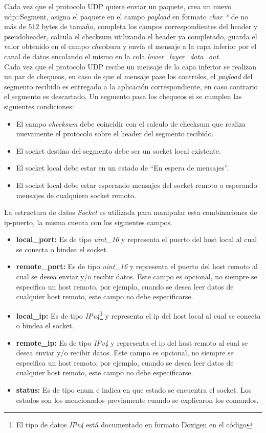\documentclass[10pt,a4paper]{article}
\begin{document}
Cada vez que el protocolo UDP quiere enviar un paquete, crea un nuevo udp::Segment, asigna el paquete en el campo \textit{payload} en formato \textit{char *} de no más de $512$ bytes de tamaño, completa los campos correspondientes del header y pseudoheader, calcula el checksum utilizando el header ya completado, guarda el valor obtenido en el campo \textit{checksum} y envía el mensaje a la capa inferior por el canal de datos encolando el mismo en la cola \textit{lower\_layer\_data\_out}. \\

Cada vez que el protocolo UDP recibe un mensaje de la capa inferior se realizan un par de chequeos, en caso de que el mensaje pase los controles, el \textit{payload} del segmento recibido es entregado a la aplicación correspondiente, en caso contrario el segmento es descartado. Un segmento pasa los chequeos si se cumplen las siguientes condiciones:

\begin{itemize}
\item El campo \textit{checksum} debe coincidir con el calculo de checksum que realiza nuevamente el protocolo sobre el header del segmento recibido.
\item El socket destino del segmento debe ser un socket local existente.
\item El socket local debe estar en un estado de ``En espera de mensajes''.
\item El socket local debe estar esperando mensajes del socket remoto o esperando mensajes de cualquiero socket remoto.
\end{itemize}

La estructura de datos \textit{Socket} es utilizada para manipular esta combinaciones de ip-puerto, la misma cuenta con los siguientes campos.

\begin{itemize}
\item \textbf{local\_port: } Es de tipo \textit{uint\_16} y representa el puerto del host local al cual se conecta o bindea el socket.
\item \textbf{remote\_port: } Es de tipo \textit{uint\_16} y representa el puerto del host remoto al cual se desea enviar y/o recibir datos. Este campo es opcional, no siempre se especifica un host remoto, por ejemplo, cuando se desea leer datos de cualquier host remoto, este campo no debe especificarse.
\item \textbf{local\_ip: } Es de tipo \textit{IPv4}\footnote{El tipo de datos \textit{IPv4} está documentado en formato Doxigen en el código} y representa el ip del host local al cual se conecta o bindea el socket.
\item \textbf{remote\_ip: } Es de tipo \textit{IPv4} y representa el ip del host remoto al cual se desea enviar y/o recibir datos. Este campo es opcional, no siempre se especifica un host remoto, por ejemplo, cuando se desea leer datos de cualquier host remoto, este campo no debe especificarse.
\item \textbf{status: } Es de tipo enum e indica en que estado se encuentra el socket. Los estados son los mencionados previamente cuando se explicaron los comandos.
\end{itemize}
\end{document}
